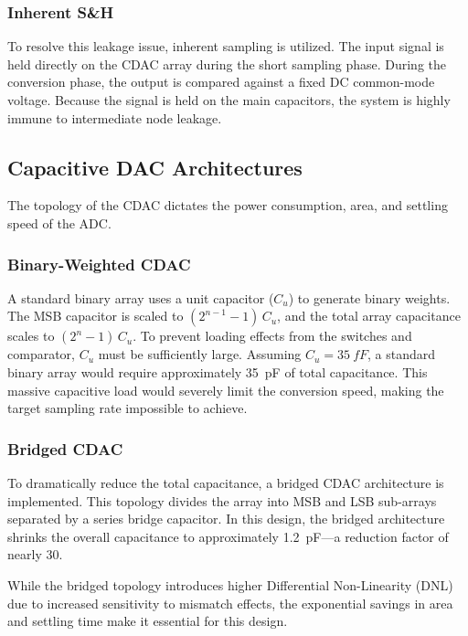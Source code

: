 \subsubsection{Inherent S\&H}

To resolve this leakage issue, inherent sampling is utilized. The input signal is held directly
on the CDAC array during the short sampling phase. During the conversion phase, the output is
compared against a fixed DC common-mode voltage. Because the signal is held on the main
capacitors, the system is highly immune to intermediate node leakage.

\subsection{Capacitive DAC Architectures}

The topology of the CDAC dictates the power consumption, area, and settling speed of the ADC.

\subsubsection{Binary-Weighted CDAC}

A standard binary array uses a unit capacitor ($C_u$) to generate binary weights. The MSB
capacitor is scaled to $(2^{n-1} - 1)\,C_u$, and the total array capacitance scales to
$(2^n - 1)\,C_u$. To prevent loading effects from the switches and comparator, $C_u$ must be
sufficiently large. Assuming $C_u = \SI{35}{fF}$, a standard binary array would require
approximately \SI{35}{pF} of total capacitance. This massive capacitive load would severely
limit the conversion speed, making the target sampling rate impossible to achieve.

\subsubsection{Bridged CDAC}

To dramatically reduce the total capacitance, a bridged CDAC architecture is implemented. This
topology divides the array into MSB and LSB sub-arrays separated by a series bridge capacitor.
In this design, the bridged architecture shrinks the overall capacitance to approximately
\SI{1.2}{pF}---a reduction factor of nearly 30.

While the bridged topology introduces higher Differential Non-Linearity (DNL) due to increased
sensitivity to mismatch effects, the exponential savings in area and settling time make it
essential for this design.

